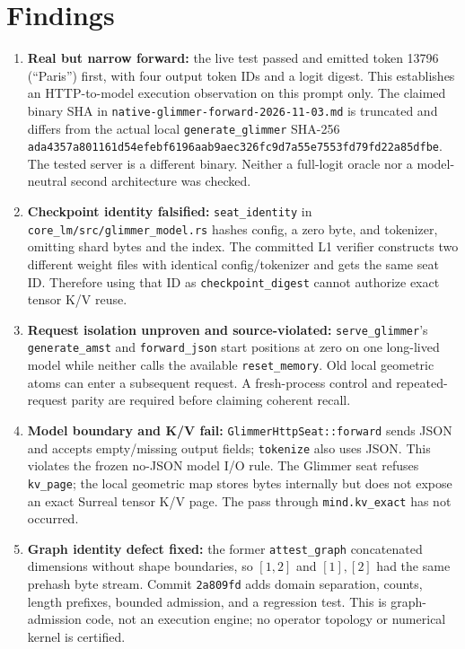 \documentclass{article}
\begin{document}
\section*{Findings}
\begin{enumerate}
\item \textbf{Real but narrow forward:} the live test passed and emitted token
13796 (``Paris'') first, with four output token IDs and a logit digest. This
establishes an HTTP-to-model execution observation on this prompt only. The
claimed binary SHA in \texttt{native-glimmer-forward-2026-11-03.md} is truncated
and differs from the actual local \texttt{generate\_glimmer} SHA-256
\texttt{ada4357a801161d54efebf6196aab9aec326fc9d7a55e7553fd79fd22a85dfbe}.
The tested server is a different binary. Neither a full-logit oracle nor a
model-neutral second architecture was checked.
\item \textbf{Checkpoint identity falsified:} \texttt{seat\_identity} in
\texttt{core\_lm/src/glimmer\_model.rs} hashes config, a zero byte, and
tokenizer, omitting shard bytes and the index. The committed L1 verifier
constructs two different weight files with identical config/tokenizer and
gets the same seat ID. Therefore using that ID as \texttt{checkpoint\_digest}
cannot authorize exact tensor K/V reuse.
\item \textbf{Request isolation unproven and source-violated:}
\texttt{serve\_glimmer}'s \texttt{generate\_amst} and \texttt{forward\_json}
start positions at zero on one long-lived model while neither calls the
available \texttt{reset\_memory}. Old local geometric atoms can enter a
subsequent request. A fresh-process control and repeated-request parity are
required before claiming coherent recall.
\item \textbf{Model boundary and K/V fail:} \texttt{GlimmerHttpSeat::forward}
sends JSON and accepts empty/missing output fields; \texttt{tokenize} also
uses JSON. This violates the frozen no-JSON model I/O rule. The Glimmer seat
refuses \texttt{kv\_page}; the local geometric map stores bytes internally
but does not expose an exact Surreal tensor K/V page. The pass through
\texttt{mind.kv\_exact} has not occurred.
\item \textbf{Graph identity defect fixed:} the former
\texttt{attest\_graph} concatenated dimensions without shape boundaries, so
\([1,2]\) and \([1],[2]\) had the same prehash byte stream. Commit
\texttt{2a809fd} adds domain separation, counts, length prefixes, bounded
admission, and a regression test. This is graph-admission code, not an
execution engine; no operator topology or numerical kernel is certified.
\end{enumerate}
\end{document}
